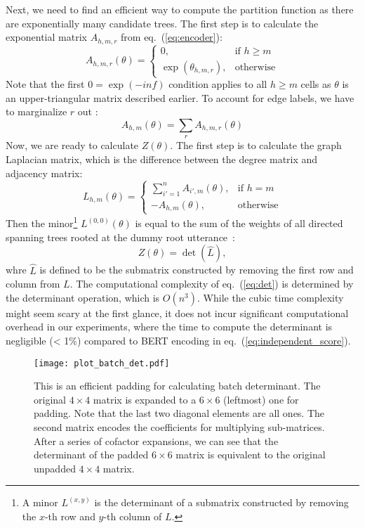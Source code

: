 \documentclass[11pt]{article}
\begin{document}
Next, we need to find an efficient way to compute the partition function as there are exponentially many candidate trees. The first step is to calculate the exponential matrix $A_{h,m,r}$ from eq.~(\ref{eq:encoder}):
\begin{equation}
  A_{h,m,r}(\theta) =
    \begin{cases}
      0, & \text{if $h\geq m$} \\
      \exp(\theta_{h,m,r}), & \text{otherwise}
    \end{cases}
    \label{eq:pre_potential}
\end{equation}
Note that the first $0=\exp(-inf)$ condition applies to all $h\geq m$ cells as $\theta$ is an upper-triangular matrix described earlier.
To account for edge labels, we have to marginalize $r$ out :
\begin{equation}
  A_{h,m}(\theta) = \sum_r A_{h,m,r}(\theta)
    \label{eq:potential}
\end{equation}
Now, we are ready to calculate $Z(\theta)$.
The first step is to calculate the graph Laplacian matrix, which is the difference between the degree matrix and adjacency matrix:
\begin{equation}
  L_{h,m}(\theta) =
    \begin{cases}
      \sum_{i'=1}^n A_{i',m}(\theta), & \text{if $h=m$} \\
      -A_{h,m}(\theta), & \text{otherwise}
    \end{cases}       
\end{equation}
Then the minor\footnote{A minor $L^{(x,y)}$ is the determinant of a submatrix constructed by removing the $x$-th row and $y$-th column of $L$.} $L^{(0,0)}(\theta)$ is equal to the sum of the weights of all directed spanning trees rooted at the dummy root utterance~\cite{tutte1984graph}:
\begin{equation}
    Z(\theta) = \det(\hat L),
    \label{eq:det}
\end{equation}
whre $\hat L$ is defined to be the submatrix constructed by removing the first row and column from $L$.
The computational complexity of eq.~(\ref{eq:det}) is determined by the determinant operation, which is $O(n^3)$.
While the cubic time complexity might seem scary at the first glance, it does not incur significant computational overhead in our experiments, where the time to compute the determinant is negligible (< 1\%) compared to BERT encoding in eq.~(\ref{eq:independent_score}).

\begin{figure*}[]
\hspace*{-10mm} \texttt{[image: plot\_batch\_det.pdf]}
\caption{This is an efficient padding for calculating batch determinant. The original $4\times 4$ matrix is expanded to a $6\times6$ (leftmost) one for padding. Note that the last two diagonal elements are all ones. The second matrix encodes the coefficients for multiplying sub-matrices. After a series of cofactor expansions, we can see that the determinant of the padded $6\times 6$ matrix is equivalent to the original unpadded $4\times4$ matrix.}
\label{fig:batch_det}
\vspace{-3mm}
\end{figure*}
\end{document}
